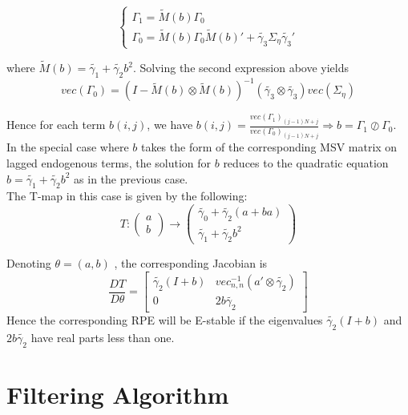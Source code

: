 \documentclass[12pt,reqno]{article}
\numberwithin{equation}{section}
\begin{document}
$$
\begin{cases}
\Gamma_1 = \tilde{M}(b) \Gamma_0 \\
\Gamma_0 = \tilde{M}(b) \Gamma_0 \tilde{M}(b)' + \tilde{\gamma_3}\Sigma_{\eta} \tilde{\gamma_3}' 
\end{cases}
$$

where $\tilde{M}(b) = \tilde{\gamma_1} + \tilde{\gamma_2} b^2$. Solving the second expression above yields 
$$ vec(\Gamma_0) = (I- \tilde{M}(b) \otimes \tilde{M}(b))^{-1} (\tilde{\gamma_3} \otimes \tilde{\gamma_3}) vec(\Sigma_{\eta}) $$

Hence for each term $b(i,j) $, we have $ b(i,j) = \frac{vec(\Gamma_1)_{(j-1)N+j}}{vec(\Gamma_0)_{(j-1)N+j}} \Rightarrow b = \Gamma_1 \oslash \Gamma_0 $. \\

In the special case where $ b $ takes the form of the corresponding MSV matrix on lagged endogenous terms, the solution for $ b $ reduces to the quadratic equation $ b = \tilde{\gamma_1 } + \tilde{\gamma_2 } b^2 $ as in the previous case. \\

The T-map in this case is given by the following: \\

$$
T: \begin{pmatrix} a \\ b \end{pmatrix}  \rightarrow \begin{pmatrix} \tilde{\gamma_0} + \tilde{\gamma_2} (a+ba) \\ \tilde{\gamma_1} + \tilde{\gamma_2} b^2 \end{pmatrix} 
$$

Denoting $ \theta = (a,b) $ , the corresponding Jacobian is \\

$$
\frac{DT}{ D \theta} = \begin{bmatrix}  \tilde{\gamma_2 } (I+b) & vec^{-1}_{n,n} ( a' \otimes \tilde{\gamma_2}) \\ 0 & 2 b \tilde{\gamma_2}  \end{bmatrix} 
$$
Hence the corresponding RPE will be E-stable if the eigenvalues $\tilde{\gamma_2} (I+b) $ and $ 2 b \tilde{\gamma_2} $ have real parts less than one. \\

\section*{Filtering Algorithm }
\end{document}
